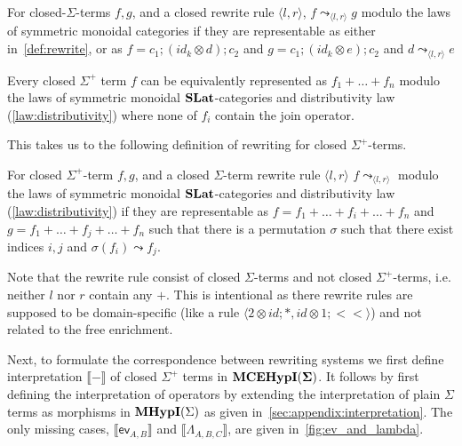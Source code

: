 \begin{definition}
	For closed-$\Sigma$-terms $f,g$, and a closed rewrite rule $\langle l, r \rangle$, $f \leadsto_{\langle l, r \rangle} g$ modulo the laws of symmetric monoidal categories if they are representable as either in~\autoref{def:rewrite}, or as
	$
		f = c_{1};(id_{k} \otimes d);c_{2} $ and $ g = c_{1};(id_{k} \otimes e);c_{2}
	$
	and $d \leadsto_{\langle l, r \rangle} e$
\end{definition}
\begin{lemma}
	\label{lemma:normal_form}
	Every closed $\Sigma^{+}$ term $f$ can be equivalently represented as
	$
		f_{1} + \ldots + f_{n}
	$ modulo the laws of symmetric monoidal $\mathbf{SLat}$-categories and distributivity law (\autoref{law:distributivity}) where none of $f_{i}$ contain the join operator.
\end{lemma}
This takes us to the following definition of rewriting for closed $\Sigma^{+}$-terms.
\begin{definition}
	For closed $\Sigma^{+}$-term $f,g$, and a closed $\Sigma$-term rewrite rule $\langle l, r \rangle$ $f \leadsto_{\langle l, r \rangle}$ modulo the laws of symmetric monoidal $\mathbf{SLat}$-categories and distributivity law (\autoref{law:distributivity}) if they are representable as
	$
		f = f_{1} + \ldots + f_{i} + \ldots + f_{n} $ and $ g = f_{1} + \ldots + f_{j} + \ldots + f_{n}
	$
	such that there is a permutation $\sigma$ such that there exist indices $i,j$ and $\sigma(f_{i}) \leadsto f_{j}$.
\end{definition}
Note that the rewrite rule consist of closed $\Sigma$-terms and not closed $\Sigma^{+}$-terms, i.e. neither $l$ nor $r$ contain any $+$.
This is intentional as there rewrite rules are supposed to be domain-specific (like a rule $\langle 2 \otimes id;*, id \otimes 1; <\!\!< \rangle$) and not related to the free enrichment.

Next, to formulate the correspondence between rewriting systems we first define interpretation $\llbracket - \rrbracket$ of closed $\Sigma^{+}$ terms in ${\mathbf{MCEHypI(\Sigma)}}$.
It follows by first defining the interpretation of operators by extending the interpretation of plain $\Sigma$ terms as morphisms in $\textbf{MHypI}(\Sigma)$ as given in~\autoref{sec:appendix:interpretation}.
The only missing cases, $\llbracket \textsf{ev}_{A,B} \rrbracket$ and $\llbracket \Lambda_{A,B,C} \rrbracket$, are given in~\autoref{fig:ev_and_lambda}.

